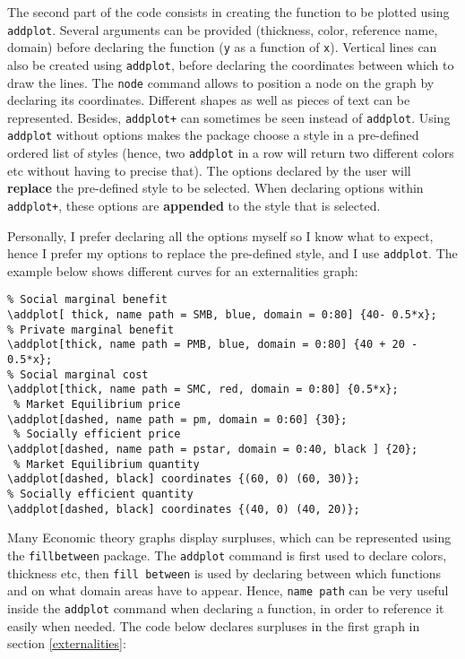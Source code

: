 \documentclass[english]{article}
\begin{document}
The second part of the code consists in creating the function to be plotted using \texttt{addplot}. Several arguments can be provided (thickness, color, reference name, domain) before declaring the function (\texttt{y} as a function of \texttt{x}). Vertical lines can also be created using \texttt{addplot}, before declaring the coordinates between which to draw the lines. The \texttt{node} command allows to position a node on the graph by declaring its coordinates. Different shapes as well as pieces of text can be represented. 
Besides, \texttt{addplot+} can sometimes be seen instead of \texttt{addplot}. Using \texttt{addplot} without options makes the package choose a style in a pre-defined ordered list of styles (hence, two \texttt{addplot} in a row will return two different colors etc without having to precise that). The options declared by the user will \textbf{replace} the pre-defined style to be selected. When declaring options within \texttt{addplot+}, these options are \textbf{appended} to the style that is selected. 

Personally, I prefer declaring all the options myself so I know what to expect, hence I prefer my options to replace the pre-defined style, and I use \texttt{addplot}.
The example below shows different curves for an externalities graph:

\begin{lstlisting}
% Social marginal benefit
\addplot[ thick, name path = SMB, blue, domain = 0:80] {40- 0.5*x};
% Private marginal benefit
\addplot[thick, name path = PMB, blue, domain = 0:80] {40 + 20 - 0.5*x};
% Social marginal cost
\addplot[thick, name path = SMC, red, domain = 0:80] {0.5*x};
 % Market Equilibrium price
\addplot[dashed, name path = pm, domain = 0:60] {30}; 
 % Socially efficient price
\addplot[dashed, name path = pstar, domain = 0:40, black ] {20};  
 % Market Equilibrium quantity
\addplot[dashed, black] coordinates {(60, 0) (60, 30)}; 
% Socially efficient quantity
\addplot[dashed, black] coordinates {(40, 0) (40, 20)};
\end{lstlisting}

Many Economic theory graphs display surpluses, which can be represented using the \texttt{fillbetween} package. The \texttt{addplot} command is first used to declare colors, thickness etc, then \texttt{fill between} is used by declaring between which functions and on what domain areas have to appear. Hence, \texttt{name path} can be very useful inside the \texttt{addplot} command when declaring a function, in order to reference it easily when needed. The code below declares surpluses in the first graph in section \ref{externalities}:
\end{document}
